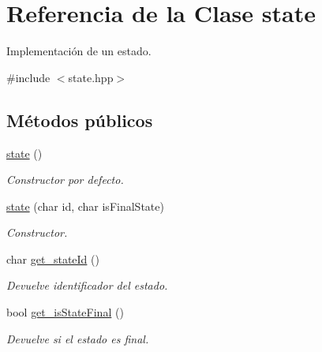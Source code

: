 \hypertarget{classstate}{}\section{Referencia de la Clase state}
\label{classstate}


Implementación de un estado.  




{\ttfamily \#include $<$state.\+hpp$>$}

\subsection*{Métodos públicos}
\begin{DoxyCompactItemize}
\item 
\mbox{\label{classstate_aee920d9f534640451f22b3525f9cb9de}} 
\mbox{\hyperlink{classstate_aee920d9f534640451f22b3525f9cb9de}{state}} ()
\begin{DoxyCompactList}\small\item\em Constructor por defecto. \end{DoxyCompactList}\item 
\mbox{\label{classstate_a812734a4f547d491a5687ba90d136127}} 
\mbox{\hyperlink{classstate_a812734a4f547d491a5687ba90d136127}{state}} (char id, char is\+Final\+State)
\begin{DoxyCompactList}\small\item\em Constructor. \end{DoxyCompactList}\item 
\mbox{\label{classstate_a864ef817493becc7064268d2a8e39a9a}} 
char \mbox{\hyperlink{classstate_a864ef817493becc7064268d2a8e39a9a}{get\+\_\+state\+Id}} ()
\begin{DoxyCompactList}\small\item\em Devuelve identificador del estado. \end{DoxyCompactList}\item 
\mbox{\label{classstate_a45d2639356a8b7ca910ab9aebee13e7a}} 
bool \mbox{\hyperlink{classstate_a45d2639356a8b7ca910ab9aebee13e7a}{get\+\_\+is\+State\+Final}} ()
\begin{DoxyCompactList}\small\item\em Devuelve si el estado es final. \end{DoxyCompactList}\item 

\end{DoxyCompactItemize}
